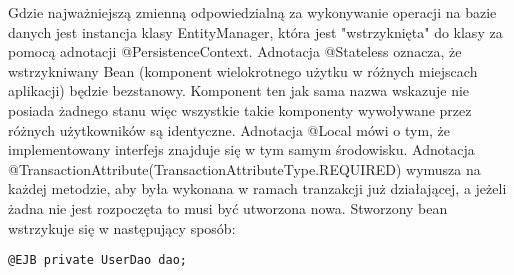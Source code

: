 Gdzie najważniejszą zmienną odpowiedzialną za wykonywanie operacji na bazie danych jest instancja klasy EntityManager, która jest "wstrzyknięta" do klasy za pomocą adnotacji @PersistenceContext. Adnotacja @Stateless oznacza, że wstrzykniwany Bean (komponent wielokrotnego użytku w różnych miejscach aplikacji) będzie bezstanowy. Komponent ten jak sama nazwa wskazuje nie posiada żadnego stanu więc wszystkie takie komponenty wywoływane przez różnych użytkowników są identyczne. Adnotacja @Local mówi o tym, że implementowany interfejs znajduje się w tym samym środowisku. Adnotacja @TransactionAttribute(TransactionAttributeType.REQUIRED) wymusza na każdej metodzie, aby była wykonana w ramach tranzakcji już działającej, a jeżeli żadna nie jest rozpoczęta to musi być utworzona nowa. Stworzony bean wstrzykuje się w następujący sposób:
\begin{lstlisting}
@EJB private UserDao dao;
\end{lstlisting}

